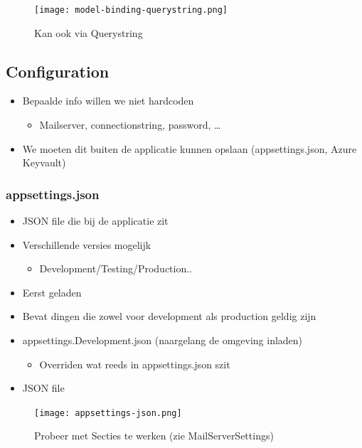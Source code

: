 \documentclass{article}
\begin{document}
\begin{figure}[H]
    \centering
    \texttt{[image: model-binding-querystring.png]}
    \caption{Kan ook via Querystring}
\end{figure}

\subsection{Configuration}

\begin{itemize}
    \item Bepaalde info willen we niet hardcoden
    \begin{itemize}
        \item Mailserver, connectionstring, password, \dots
    \end{itemize}
    \item We moeten dit buiten de applicatie kunnen opslaan (appsettings.json, Azure Keyvault)
\end{itemize}

\subsubsection{appsettings.json}

\begin{itemize}
    \item JSON file die bij de applicatie zit
    \item Verschillende versies mogelijk
    \begin{itemize}
        \item Development/Testing/Production..
    \end{itemize}
    \item Eerst geladen
    \item Bevat dingen die zowel voor development als production geldig zijn
    \item appsettings.Development.json (naargelang de omgeving inladen)
    \begin{itemize}
        \item Overriden wat reeds in appsettings.json szit
    \end{itemize}
    \item JSON file
\end{itemize}

\begin{figure}[H]
    \centering
    \texttt{[image: appsettings-json.png]}
    \caption{Probeer met Secties te werken (zie MailServerSettings)}
\end{figure}
\end{document}
